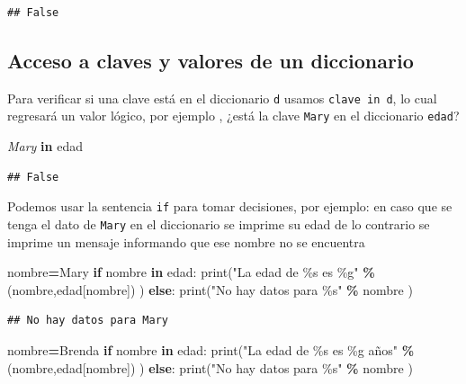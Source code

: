 \documentclass[
]{book}
\newenvironment{Shaded}{\begin{snugshade}}{\end{snugshade}}
\newcommand{\BuiltInTok}[1]{#1}
\newcommand{\CommentTok}[1]{\textcolor[rgb]{0.56,0.35,0.01}{\textit{#1}}}
\newcommand{\ControlFlowTok}[1]{\textcolor[rgb]{0.13,0.29,0.53}{\textbf{#1}}}
\newcommand{\KeywordTok}[1]{\textcolor[rgb]{0.13,0.29,0.53}{\textbf{#1}}}
\newcommand{\NormalTok}[1]{#1}
\newcommand{\OperatorTok}[1]{\textcolor[rgb]{0.81,0.36,0.00}{\textbf{#1}}}
\newcommand{\SpecialCharTok}[1]{\textcolor[rgb]{0.00,0.00,0.00}{#1}}
\newcommand{\StringTok}[1]{\textcolor[rgb]{0.31,0.60,0.02}{#1}}
\theoremstyle{definition}
\theoremstyle{definition}
\theoremstyle{definition}
\theoremstyle{definition}
\theoremstyle{remark}
\begin{document}
\begin{verbatim}
## False
\end{verbatim}

\hypertarget{acceso-a-claves-y-valores-de-un-diccionario}{%
\subsection{Acceso a claves y valores de un diccionario}\label{acceso-a-claves-y-valores-de-un-diccionario}}

Para verificar si una clave está en el diccionario \texttt{d} usamos \texttt{clave\ in\ d}, lo cual regresará un valor lógico, por ejemplo , ¿está la clave \texttt{Mary} en el diccionario \texttt{edad}?

\begin{Shaded}
\begin{Highlighting}[]
\CommentTok{\textquotesingle{}Mary\textquotesingle{}} \KeywordTok{in}\NormalTok{ edad }
\end{Highlighting}
\end{Shaded}

\begin{verbatim}
## False
\end{verbatim}

Podemos usar la sentencia \texttt{if} para tomar decisiones, por ejemplo: en caso que se tenga el dato de \texttt{Mary} en el diccionario se imprime su edad de lo contrario se imprime un mensaje informando que ese nombre no se encuentra

\begin{Shaded}
\begin{Highlighting}[]
\NormalTok{nombre}\OperatorTok{=}\StringTok{\textquotesingle{}Mary\textquotesingle{}}  
\ControlFlowTok{if}\NormalTok{ nombre }\KeywordTok{in}\NormalTok{ edad:}
  \BuiltInTok{print}\NormalTok{(}\StringTok{"La edad de }\SpecialCharTok{\%s}\StringTok{ es }\SpecialCharTok{\%g}\StringTok{"} \OperatorTok{\%}\NormalTok{ (nombre,edad[nombre]) )}
\ControlFlowTok{else}\NormalTok{:}
  \BuiltInTok{print}\NormalTok{(}\StringTok{"No hay datos para }\SpecialCharTok{\%s}\StringTok{"} \OperatorTok{\%}\NormalTok{ nombre )}
\end{Highlighting}
\end{Shaded}

\begin{verbatim}
## No hay datos para Mary
\end{verbatim}

\begin{Shaded}
\begin{Highlighting}[]
\NormalTok{nombre}\OperatorTok{=}\StringTok{\textquotesingle{}Brenda\textquotesingle{}}  
\ControlFlowTok{if}\NormalTok{ nombre }\KeywordTok{in}\NormalTok{ edad:}
  \BuiltInTok{print}\NormalTok{(}\StringTok{"La edad de }\SpecialCharTok{\%s}\StringTok{ es }\SpecialCharTok{\%g}\StringTok{ años"} \OperatorTok{\%}\NormalTok{ (nombre,edad[nombre]) )}
\ControlFlowTok{else}\NormalTok{:}
  \BuiltInTok{print}\NormalTok{(}\StringTok{"No hay datos para }\SpecialCharTok{\%s}\StringTok{"} \OperatorTok{\%}\NormalTok{ nombre )}
\end{Highlighting}
\end{Shaded}
\end{document}
